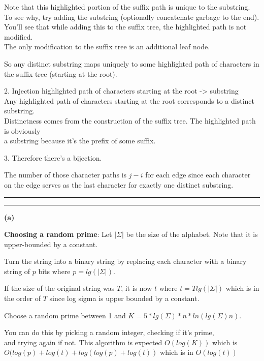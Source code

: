 \documentclass[11pt]{article}
\newcommand{\question}[2] {\vspace{.25in} \hrule\vspace{0.5em}
\noindent{\bf #1: #2} \vspace{0.5em}
\hrule \vspace{.10in}}
\renewcommand{\part}[1] {\vspace{.10in} {\bf (#1)}}
\begin{document}
Note that this highlighted portion of the suffix path is unique to the substring.\\
To see why, try adding the substring (optionally concatenate garbage to the end).\\
You'll see that while adding this to the suffix tree, the highlighted path is not modified.\\
The only modification to the suffix tree is an additional leaf node.

So any distinct substring maps uniquely to some highlighted path of characters in the suffix tree (starting at the root).


2. Injection highlighted path of characters starting at the root -> substring\\
Any highlighted path of characters starting at the root corresponds to a distinct substring.\\
Distinctness comes from the construction of the suffix tree. The highlighted path is obviously\\
a substring because it's the prefix of some suffix.

3. Therefore there's a bijection.

The number of those character paths is $j-i$ for each edge since each character on the edge serves as the last character for exactly one distinct substring.





\question{3}{LDIS}
\part{a}

\textbf{Choosing a random prime}:
Let $|\Sigma|$ be the size of the alphabet. Note that it is upper-bounded by a constant.

Turn the string into a binary string by replacing each character with a binary string of $p$ bits where $p = lg(|\Sigma|)$.

If the size of the original string was $T$, it is now $t$ where $t = T lg(|\Sigma|)$ which is in the order of $T$ since log sigma is upper bounded by a constant.

Choose a random prime between 1 and $K = 5*lg(\Sigma)*n*ln(lg(\Sigma)n)$.

You can do this by picking a random integer, checking if it's prime,\\
and trying again if not. This algorithm is expected $O(log(K))$ which is $O(log(p) + log(t) + log(log(p) + log(t))$ which is in $O(log(t))$
\end{document}
